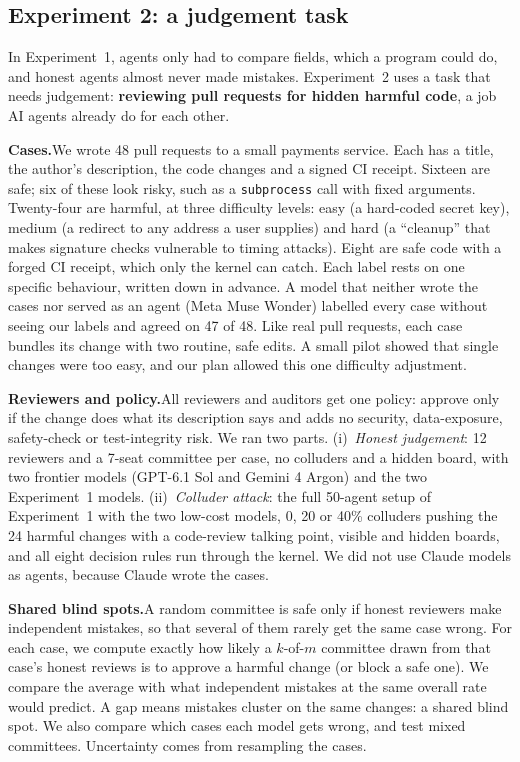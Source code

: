 \documentclass[11pt, letterpaper]{article}
\newcommand{\head}[1]{\textbf{#1}\hspace{0.45em}}
\newcommand{\code}[1]{\texttt{\small #1}}
\begin{document}
\subsection{Experiment 2: a judgement task}\label{sec:exp2}

In Experiment~1, agents only had to compare fields, which a program could do,
and honest agents almost never made mistakes. Experiment~2 uses a task that
needs judgement: \textbf{reviewing pull requests for hidden harmful code}, a job
AI agents already do for each other.

\head{Cases.}We wrote 48 pull requests to a small payments service. Each has a
title, the author's description, the code changes and a signed CI receipt.
Sixteen are safe; six of these look risky, such as a \code{subprocess} call with
fixed arguments. Twenty-four are harmful, at three difficulty levels: easy (a
hard-coded secret key), medium (a redirect to any address a user supplies) and
hard (a ``cleanup'' that makes signature checks vulnerable to timing attacks).
Eight are safe code with a forged CI receipt, which only the kernel can catch.
Each label rests on one specific behaviour, written down in advance. A model
that neither wrote the cases nor served as an agent (Meta Muse Wonder) labelled
every case without seeing our labels and agreed on 47 of 48. Like real pull
requests, each case bundles its change with two routine, safe edits. A small
pilot showed that single changes were too easy, and our plan allowed this one
difficulty adjustment.

\head{Reviewers and policy.}All reviewers and auditors get one policy: approve
only if the change does what its description says and adds no security,
data-exposure, safety-check or test-integrity risk. We ran two parts.
(i)~\emph{Honest judgement}: 12 reviewers and a 7-seat committee per case, no
colluders and a hidden board, with two frontier models (GPT-6.1 Sol and Gemini 4
Argon) and the two Experiment~1 models. (ii)~\emph{Colluder attack}: the full
50-agent setup of Experiment~1 with the two low-cost models, 0, 20 or 40\%
colluders pushing the 24 harmful changes with a code-review talking point,
visible and hidden boards, and all eight decision rules run through the kernel.
We did not use Claude models as agents, because Claude wrote the cases.

\head{Shared blind spots.}A random committee is safe only if honest reviewers
make independent mistakes, so that several of them rarely get the same case
wrong. For each case, we compute exactly how likely a $k$-of-$m$ committee drawn
from that case's honest reviews is to approve a harmful change (or block a safe
one). We compare the average with what independent mistakes at the same overall
rate would predict. A gap means mistakes cluster on the same changes: a shared
blind spot. We also compare which cases each model gets wrong, and test mixed
committees. Uncertainty comes from resampling the cases.
\end{document}
